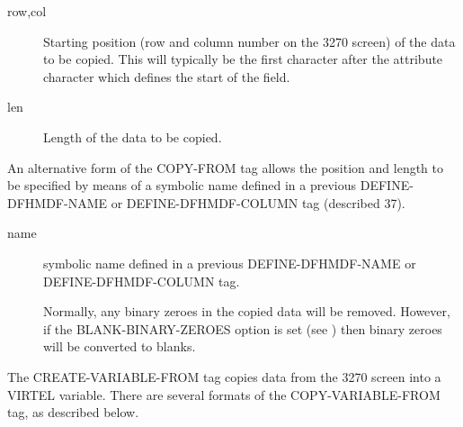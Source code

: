 \documentclass[letterpaper,10pt,english]{sphinxmanual}
\begin{document}
\begin{sphinxVerbatim}[commandchars=\\\{\}]
     
\end{sphinxVerbatim}
\begin{description}
\item[{row,col}] \leavevmode
Starting position (row and column number on the 3270 screen) of the
data to be copied. This will typically be the first character after
the attribute character which defines the start of the field.

\item[{len}] \leavevmode
Length of the data to be copied.

\end{description}

An alternative form of the COPY-FROM tag allows the position and length to be specified by means of a symbolic name defined in a previous DEFINE-DFHMDF-NAME or DEFINE-DFHMDF-COLUMN tag (described 37).

\begin{sphinxVerbatim}[commandchars=\\\{\}]
   
\end{sphinxVerbatim}
\begin{description}
\item[{name}] \leavevmode
symbolic name defined in a previous DEFINE-DFHMDF-NAME or DEFINE-DFHMDF-COLUMN tag.

Normally, any binary zeroes in the copied data will be removed. However, if the BLANK-BINARY-ZEROES option is set (see {\hyperref[\detokenize{User_Guide:v457ug-setting-local-options}]{}}) then binary zeroes will be converted to blanks.

\end{description}
\label{\detokenize{User_Guide:v457ug-create-variable-from}}

The CREATE-VARIABLE-FROM tag copies data from the 3270 screen into a VIRTEL variable. There are several formats of the COPY-VARIABLE-FROM tag, as described below.
\end{document}
